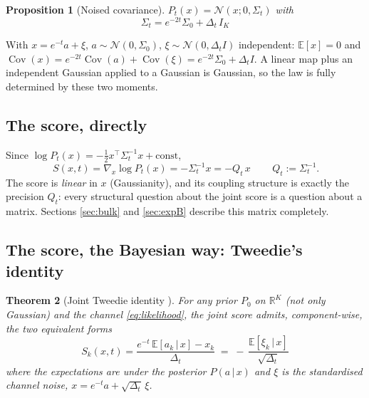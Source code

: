 \documentclass[11pt]{article}
\newtheorem{proposition}{Proposition}
\newtheorem{theorem}[proposition]{Theorem}
\theoremstyle{definition}
\newcommand{\R}{\mathbb{R}}
\newcommand{\N}{\mathcal{N}}
\newcommand{\E}{\mathbb{E}}
\newcommand{\Sig}{\Sigma}
\newcommand{\Dt}{\Delta_t}
\newcommand{\Qt}{Q_t}
\newcommand{\given}{\,|\,}
\newcommand{\T}{^{\!\top}}
\DeclareMathOperator{\Cov}{Cov}
\begin{document}
\begin{proposition}[Noised covariance]\label{prop:Sigt}
$P_t(x)=\N(x;0,\Sig_t)$ with
\begin{equation}\label{eq:Sigt}
  \boxed{\ \Sig_t=e^{-2t}\Sig_0+\Dt\,I_K\ }
\end{equation}
\end{proposition}

\begin{derivation}[\ref*{prop:Sigt}]
With $x=e^{-t}a+\xi$, $a\sim\N(0,\Sig_0)$, $\xi\sim\N(0,\Dt I)$ independent:
$\E[x]=0$ and
$\Cov(x)=e^{-2t}\Cov(a)+\Cov(\xi)=e^{-2t}\Sig_0+\Dt I$. A linear map plus an
independent Gaussian applied to a Gaussian is Gaussian, so the law is fully
determined by these two moments.
\end{derivation}

\subsection{The score, directly}

Since $\log P_t(x)=-\tfrac12x\T\Sig_t^{-1}x+\text{const}$,
\begin{equation}\label{eq:score-matrix}
  \boxed{\,S(x,t)=\nabla_x\log P_t(x)=-\Sig_t^{-1}x=-\Qt\,x\,}\qquad
  \Qt:=\Sig_t^{-1}.
\end{equation}
The score is \emph{linear} in $x$ (Gaussianity), and its coupling structure is
exactly the precision $\Qt$: every structural question about the joint score
is a question about a matrix. Sections \ref{sec:bulk} and \ref{sec:expB}
describe this matrix completely.

\subsection{The score, the Bayesian way: Tweedie's identity}

\begin{theorem}[Joint Tweedie identity \citep{efron2011tweedie,
vincent2011connection}]\label{thm:tweedie}
For \emph{any} prior $P_0$ on $\R^K$ (not only Gaussian) and the channel
\eqref{eq:likelihood}, the joint score admits, component-wise, the two
equivalent forms
\begin{equation}\label{eq:tweedie}
  \boxed{\ S_k(x,t)=\frac{e^{-t}\,\E[a_k\given x]-x_k}{\Dt}
   \;=\;-\,\frac{\E[\xi_k\given x]}{\sqrt{\Dt}}\ }
\end{equation}
where the expectations are under the posterior $P(a\given x)$ and $\xi$ is the
standardised channel noise, $x=e^{-t}a+\sqrt{\Dt}\,\xi$.
\end{theorem}
\end{document}
